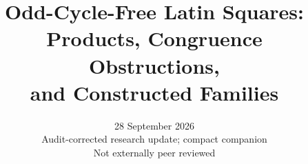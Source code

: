\documentclass[11pt]{article}
\title{Odd-Cycle-Free Latin Squares:\\
Products, Congruence Obstructions,\\
and Constructed Families}
\author{}
\date{28 September 2026\\\small Audit-corrected research update; compact companion\\Not externally peer reviewed}
\begin{document}
\maketitle


















\footnotesize


\end{document}
